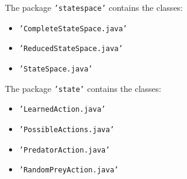 \documentclass[11pt]{article}
\begin{document}
The package \texttt{'statespace'} contains the classes:

\begin{itemize}
	\item \texttt{'CompleteStateSpace.java'}
	\item \texttt{'ReducedStateSpace.java'}
	\item \texttt{'StateSpace.java'}
\end{itemize}


The package \texttt{'state'} contains the classes:

\begin{itemize}
	\item \texttt{'LearnedAction.java'}
	\item \texttt{'PossibleActions.java'}
	\item \texttt{'PredatorAction.java'}
	\item \texttt{'RandomPreyAction.java'}
\end{itemize}
\end{document}
